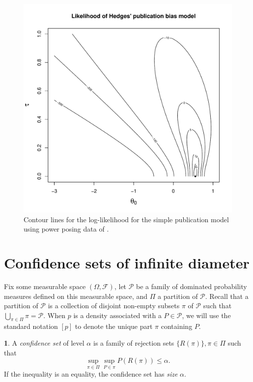 \documentclass[article]{ajs}
\numberwithin{equation}{section}
\numberwithin{figure}{section}
\theoremstyle{plain}
\theoremstyle{definition}
\newtheorem{defn}[thm]{\protect\definitionname}
\theoremstyle{definition}
\theoremstyle{plain}
\providecommand{\definitionname}{Definition}
\begin{document}
\begin{figure}
\noindent \begin{centering}
\includegraphics[scale=0.5]{chunks/cuddy}
\par\end{centering}
\caption{\label{fig:contour lines}Contour lines for the log-likelihood for
the simple publication model using power posing data of \citet{Cuddy2018-kp}. }

\end{figure}


\section{Confidence sets of infinite diameter}

Fix some measurable space $(\Omega,\mathcal{F})$, let $\mathcal{P}$
be a family of dominated probability measures defined on this measurable
space, and $\Pi$ a partition of $\mathcal{P}$. Recall that a partition
of $\mathcal{P}$ is a collection of disjoint non-empty subsets $\pi$
of $\mathcal{P}$ such that $\bigcup_{\pi\in\Pi}\pi=\mathcal{P}$.
When $p$ is a density associated with a $P\in\mathcal{P}$, we will
use the standard notation $[p]$ to denote the unique part $\pi$ containing
$P$. 
\begin{defn}
\label{def:confidence set} A \emph{confidence set} of level $\alpha$
is a family of rejection sets $\{R(\pi)\},\pi\in\Pi$ such that
\[
\sup_{\pi\in\Pi}\sup_{P\in\pi}P(R(\pi))\leq\alpha.
\]
If the inequality is an equality, the confidence set has \emph{size}
$\alpha$. 
\end{defn}
\end{document}
